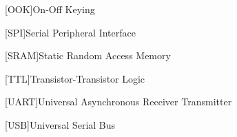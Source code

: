 \begin{acronym}
	[OOK]{On-Off Keying}
\end{acronym}

\begin{acronym}
	[SPI]{Serial Peripheral Interface}
\end{acronym}

\begin{acronym}
	[SRAM]{Static Random Access Memory}
\end{acronym}

\begin{acronym}
	[TTL]{Transistor-Transistor Logic}
\end{acronym}

\begin{acronym}
	[UART]{Universal Asynchronous Receiver Transmitter}
\end{acronym}

\begin{acronym}
	[USB]{Universal Serial Bus}
\end{acronym}









